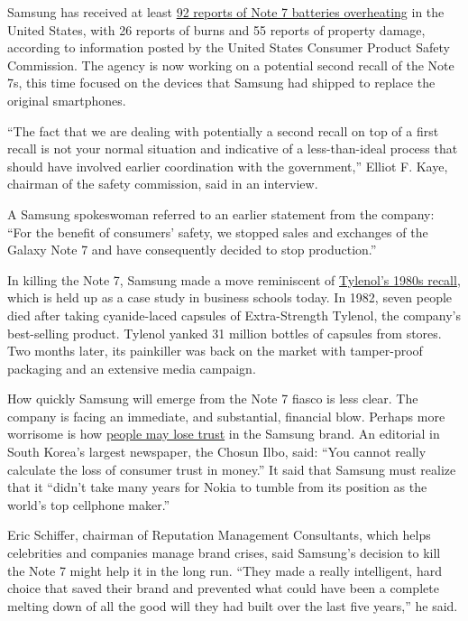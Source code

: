 Samsung has received at least
\href{https://www.cpsc.gov/Recalls/2016/Samsung-Recalls-Galaxy-Note7-Smartphones/}{92
reports of Note 7 batteries overheating} in the United States, with 26
reports of burns and 55 reports of property damage, according to
information posted by the United States Consumer Product Safety
Commission. The agency is now working on a potential second recall of
the Note 7s, this time focused on the devices that Samsung had shipped
to replace the original smartphones.

``The fact that we are dealing with potentially a second recall on top
of a first recall is not your normal situation and indicative of a
less-than-ideal process that should have involved earlier coordination
with the government,'' Elliot F. Kaye, chairman of the safety
commission, said in an interview.

A Samsung spokeswoman referred to an earlier statement from the company:
``For the benefit of consumers' safety, we stopped sales and exchanges
of the Galaxy Note 7 and have consequently decided to stop production.''

In killing the Note 7, Samsung made a move reminiscent of
\href{http://mobile.nytimes.com/2002/03/23/your-money/tylenol-made-a-hero-of-johnson-johnson-the-recall-that-started.html}{Tylenol's
1980s recall}, which is held up as a case study in business schools
today. In 1982, seven people died after taking cyanide-laced capsules of
Extra-Strength Tylenol, the company's best-selling product. Tylenol
yanked 31 million bottles of capsules from stores. Two months later, its
painkiller was back on the market with tamper-proof packaging and an
extensive media campaign.

How quickly Samsung will emerge from the Note 7 fiasco is less clear.
The company is facing an immediate, and substantial, financial blow.
Perhaps more worrisome is how
\href{http://www.nytimes.com/2016/10/12/technology/personaltech/do-you-have-a-samsung-galaxy-note-7-heres-what-to-do.html}{people
may lose trust} in the Samsung brand. An editorial in South Korea's
largest newspaper, the Chosun Ilbo, said: ``You cannot really calculate
the loss of consumer trust in money.'' It said that Samsung must realize
that it ``didn't take many years for Nokia to tumble from its position
as the world's top cellphone maker.''

Eric Schiffer, chairman of Reputation Management Consultants, which
helps celebrities and companies manage brand crises, said Samsung's
decision to kill the Note 7 might help it in the long run. ``They made a
really intelligent, hard choice that saved their brand and prevented
what could have been a complete melting down of all the good will they
had built over the last five years,'' he said.

